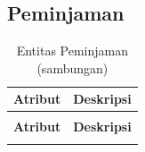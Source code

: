 \documentclass[
  12pt,
  a4paper,
  oneside,
  final
]{report}
\begin{document}
\subsection{Peminjaman}

\begin{longtable}[!htbp]{p{3.5cm} p{9cm}}
  \caption{Entitas Peminjaman}
  \label{tab:entitas-peminjaman} \\
  \toprule
  \textbf{Atribut} & \textbf{Deskripsi} \\
  \midrule
  \endfirsthead
  \caption[]{Entitas Peminjaman (sambungan)} \\
  \toprule
  \textbf{Atribut} & \textbf{Deskripsi} \\
  \midrule
  \endhead
  \bottomrule
  \endfoot


\end{longtable}
\end{document}
